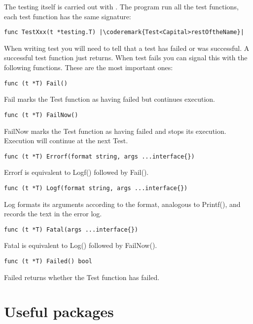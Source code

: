The testing itself is carried out with .
The  program run all the test functions, each
test function has the same signature:
\begin{lstlisting}
func TestXxx(t *testing.T) |\coderemark{Test<Capital>restOftheName}|
\end{lstlisting}

When writing test you will need to tell  that a test has failed or was successful. A
successful test function just returns. When test fails you can signal this with the following
functions\cite{go_doc}. These are the most important ones:

\begin{lstlisting}[numbers=none]
func (t *T) Fail()
\end{lstlisting}
Fail marks the Test function as having failed but continues execution.

\begin{lstlisting}[numbers=none]
func (t *T) FailNow()
\end{lstlisting}
FailNow marks the Test function as having failed and stops its execution.
Execution will continue at the next Test.

\begin{lstlisting}[numbers=none]
func (t *T) Errorf(format string, args ...interface{})
\end{lstlisting}
Errorf is equivalent to Logf() followed by Fail().

\begin{lstlisting}[numbers=none]
func (t *T) Logf(format string, args ...interface{})
\end{lstlisting}
Log formats its arguments according to the format, analogous to Printf(),
and records the text in the error log.

\begin{lstlisting}[numbers=none]
func (t *T) Fatal(args ...interface{})
\end{lstlisting}
Fatal is equivalent to Log() followed by FailNow().


\begin{lstlisting}[numbers=none]
func (t *T) Failed() bool
\end{lstlisting}
Failed returns whether the Test function has failed.




\section{Useful packages}



